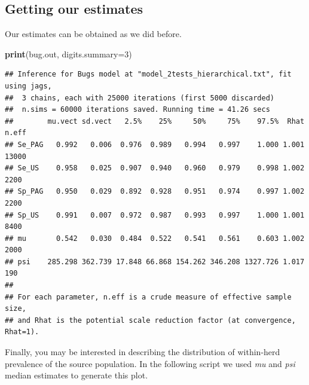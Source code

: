 \documentclass[
]{book}
\newenvironment{Shaded}{\begin{snugshade}}{\end{snugshade}}
\newcommand{\AttributeTok}[1]{\textcolor[rgb]{0.13,0.29,0.53}{#1}}
\newcommand{\DecValTok}[1]{\textcolor[rgb]{0.00,0.00,0.81}{#1}}
\newcommand{\FunctionTok}[1]{\textcolor[rgb]{0.13,0.29,0.53}{\textbf{#1}}}
\newcommand{\NormalTok}[1]{#1}
\begin{document}
\subsection{Getting our estimates}\label{getting-our-estimates-1}

Our estimates can be obtained as we did before.

\begin{Shaded}
\begin{Highlighting}[]
\FunctionTok{print}\NormalTok{(bug.out, }\AttributeTok{digits.summary=}\DecValTok{3}\NormalTok{) }
\end{Highlighting}
\end{Shaded}

\begin{verbatim}
## Inference for Bugs model at "model_2tests_hierarchical.txt", fit using jags,
##  3 chains, each with 25000 iterations (first 5000 discarded)
##  n.sims = 60000 iterations saved. Running time = 41.26 secs
##        mu.vect sd.vect   2.5%    25%     50%     75%    97.5%  Rhat n.eff
## Se_PAG   0.992   0.006  0.976  0.989   0.994   0.997    1.000 1.001 13000
## Se_US    0.958   0.025  0.907  0.940   0.960   0.979    0.998 1.002  2200
## Sp_PAG   0.950   0.029  0.892  0.928   0.951   0.974    0.997 1.002  2200
## Sp_US    0.991   0.007  0.972  0.987   0.993   0.997    1.000 1.001  8400
## mu       0.542   0.030  0.484  0.522   0.541   0.561    0.603 1.002  2000
## psi    285.298 362.739 17.848 66.868 154.262 346.208 1327.726 1.017   190
## 
## For each parameter, n.eff is a crude measure of effective sample size,
## and Rhat is the potential scale reduction factor (at convergence, Rhat=1).
\end{verbatim}

Finally, you may be interested in describing the distribution of within-herd prevalence of the source population. In the following script we used \emph{mu} and \emph{psi} median estimates to generate this plot.
\end{document}
